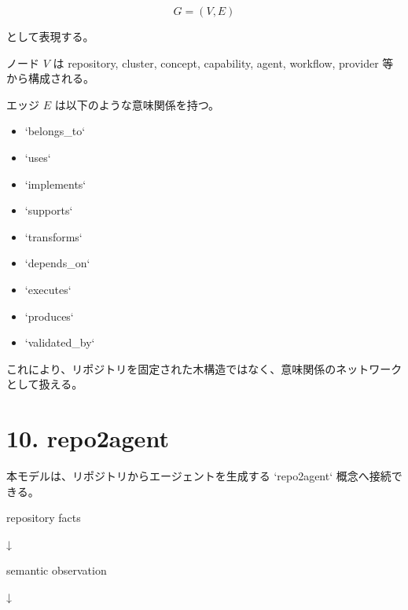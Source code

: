 \documentclass[a4paper,11pt]{jsarticle}
\begin{document}
\[


G=(V,E)


\]


として表現する。


ノード \(V\) は repository, cluster, concept, capability, agent, workflow, provider 等から構成される。


エッジ \(E\) は以下のような意味関係を持つ。


\begin{itemize}
\item `belongs_to`
\end{itemize}
\begin{itemize}
\item `uses`
\end{itemize}
\begin{itemize}
\item `implements`
\end{itemize}
\begin{itemize}
\item `supports`
\end{itemize}
\begin{itemize}
\item `transforms`
\end{itemize}
\begin{itemize}
\item `depends_on`
\end{itemize}
\begin{itemize}
\item `executes`
\end{itemize}
\begin{itemize}
\item `produces`
\end{itemize}
\begin{itemize}
\item `validated_by`
\end{itemize}
これにより、リポジトリを固定された木構造ではなく、意味関係のネットワークとして扱える。


\section{10. repo2agent}
本モデルは、リポジトリからエージェントを生成する `repo2agent` 概念へ接続できる。


repository facts


       ↓


semantic observation


       ↓
\end{document}
